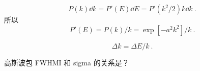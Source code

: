 
\begin{equation}
P(k)\dd{k} = P'(E)\dd{E} = P'(k^2/2)k\dd{k}~.
\end{equation}
所以
\begin{equation}
P'(E) = P(k)/k = \exp[-a^2 k^2]/k~.
\end{equation}

\begin{equation}
\Delta k = \Delta E/k~.
\end{equation}

高斯波包 FWHMI 和 sigma 的关系是？
